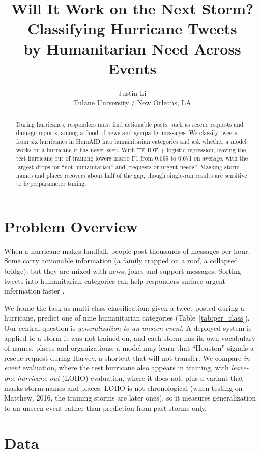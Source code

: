 \documentclass[11pt,a4paper]{article}
\title{Will It Work on the Next Storm? Classifying Hurricane Tweets\\by Humanitarian Need Across Events}
\author{Justin Li \\
  Tulane University / New Orleans, LA}
\date{}
\begin{document}
\maketitle
\begin{abstract}
During hurricanes, responders must find actionable posts, such as rescue requests and damage reports, among a flood of news and sympathy messages. We classify tweets from six hurricanes in HumAID into humanitarian categories and ask whether a model works on a hurricane it has never seen. With TF-IDF + logistic regression, leaving the test hurricane out of training lowers macro-F1 from 0.699 to 0.671 on average, with the largest drops for ``not humanitarian'' and ``requests or urgent needs''. Masking storm names and places recovers about half of the gap, though single-run results are sensitive to hyperparameter tuning.
\end{abstract}

\section{Problem Overview}

When a hurricane makes landfall, people post thousands of messages per hour. Some carry actionable information (a family trapped on a roof, a collapsed bridge), but they are mixed with news, jokes and support messages. Sorting tweets into humanitarian categories can help responders surface urgent information faster \citep{imran2015survey}.

We frame the task as multi-class classification: given a tweet posted during a hurricane, predict one of nine humanitarian categories (Table~\ref{tab:per_class}). Our central question is \emph{generalization to an unseen event}. A deployed system is applied to a storm it was not trained on, and each storm has its own vocabulary of names, places and organizations; a model may learn that ``Houston'' signals a rescue request during Harvey, a shortcut that will not transfer. We compare \emph{in-event} evaluation, where the test hurricane also appears in training, with \emph{leave-one-hurricane-out} (LOHO) evaluation, where it does not, plus a variant that masks storm names and places. LOHO is not chronological (when testing on Matthew, 2016, the training storms are later ones), so it measures generalization to an unseen event rather than prediction from past storms only.

\section{Data}
\end{document}
